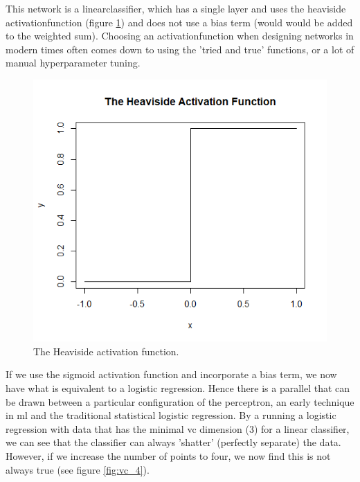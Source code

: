 This network is a \gls{linearclassifier}, which has a single \gls{layer} and uses the heaviside \gls{activationfunction} (figure \ref{fig:heavi_function}) and does not use a bias term (would would be added to the weighted sum). Choosing an \gls{activationfunction} when designing networks in modern times often comes down to using the 'tried and true' functions, or a lot of manual \gls{hyperparameter} tuning.

\begin{figure}
    \includegraphics[scale=0.5]{figs/heavi.png}
    \caption{The Heaviside activation function.}
    \label{fig:heavi_function}
\end{figure}

If we use the sigmoid activation function and incorporate a bias term, we now have what is equivalent to a logistic regression. Hence there is a parallel that can be drawn between a particular configuration of the perceptron, an early technique in \gls{ml} and the traditional statistical logistic regression. By a running a logistic regression with data that has the minimal \gls{vc} dimension (3) for a linear classifier, we can see that the classifier can always 'shatter' (perfectly separate) the data. However, if we increase the number of points to four, we now find this is not always true (see figure \ref{fig:vc_4}).

